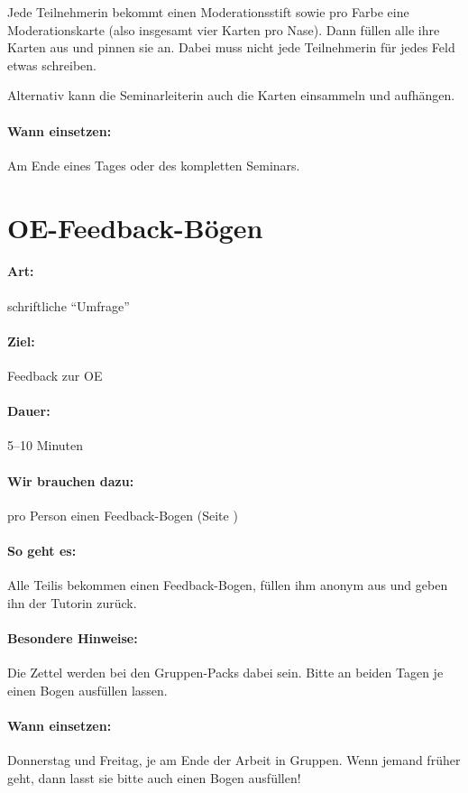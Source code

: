 Jede Teilnehmerin bekommt einen Moderationsstift sowie pro Farbe eine Moderationskarte (also insgesamt vier Karten pro Nase). Dann füllen alle ihre Karten aus und pinnen sie an. Dabei muss nicht jede Teilnehmerin für jedes Feld etwas schreiben.

Alternativ kann die Seminarleiterin auch die Karten einsammeln und aufhängen.

\paragraph{Wann einsetzen:} Am Ende eines Tages oder des kompletten Seminars.

\section{OE-Feedback-Bögen}
\paragraph{Art:} schriftliche "`Umfrage"'
\paragraph{Ziel:} Feedback zur OE
\paragraph{Dauer:} 5--10 Minuten
\paragraph{Wir brauchen dazu:} pro Person einen Feedback-Bogen (Seite \pageref{fragebogen})
\paragraph{So geht es:} Alle Teilis bekommen einen Feedback-Bogen, füllen ihm anonym aus und geben ihn der Tutorin zurück.
\paragraph{Besondere Hinweise:} Die Zettel werden bei den Gruppen-Packs dabei sein. Bitte an beiden Tagen je einen Bogen ausfüllen lassen.
\paragraph{Wann einsetzen:} Donnerstag und Freitag, je am Ende der Arbeit in Gruppen. Wenn jemand früher geht, dann lasst sie bitte auch einen Bogen ausfüllen!

